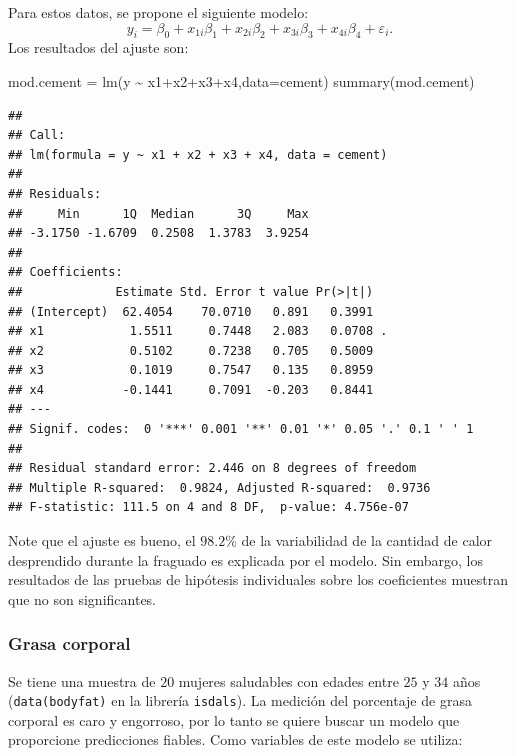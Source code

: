 \documentclass[
]{article}
\newenvironment{Shaded}{\begin{snugshade}}{\end{snugshade}}
\newcommand{\AttributeTok}[1]{\textcolor[rgb]{0.77,0.63,0.00}{#1}}
\newcommand{\FunctionTok}[1]{\textcolor[rgb]{0.00,0.00,0.00}{#1}}
\newcommand{\NormalTok}[1]{#1}
\newcommand{\OtherTok}[1]{\textcolor[rgb]{0.56,0.35,0.01}{#1}}
\newcommand{\SpecialCharTok}[1]{\textcolor[rgb]{0.00,0.00,0.00}{#1}}
\begin{document}
Para estos datos, se propone el siguiente modelo:
\[
y_{i} = \beta_{0} + x_{1i}\beta_{1} + x_{2i}\beta_{2} + x_{3i}\beta_{3} + x_{4i}\beta_{4} + \varepsilon_{i}.
\]
Los resultados del ajuste son:

\begin{Shaded}
\begin{Highlighting}[]
\NormalTok{mod.cement }\OtherTok{=} \FunctionTok{lm}\NormalTok{(y }\SpecialCharTok{\textasciitilde{}}\NormalTok{ x1}\SpecialCharTok{+}\NormalTok{x2}\SpecialCharTok{+}\NormalTok{x3}\SpecialCharTok{+}\NormalTok{x4,}\AttributeTok{data=}\NormalTok{cement)}
\FunctionTok{summary}\NormalTok{(mod.cement)}
\end{Highlighting}
\end{Shaded}

\begin{verbatim}
## 
## Call:
## lm(formula = y ~ x1 + x2 + x3 + x4, data = cement)
## 
## Residuals:
##     Min      1Q  Median      3Q     Max 
## -3.1750 -1.6709  0.2508  1.3783  3.9254 
## 
## Coefficients:
##             Estimate Std. Error t value Pr(>|t|)  
## (Intercept)  62.4054    70.0710   0.891   0.3991  
## x1            1.5511     0.7448   2.083   0.0708 .
## x2            0.5102     0.7238   0.705   0.5009  
## x3            0.1019     0.7547   0.135   0.8959  
## x4           -0.1441     0.7091  -0.203   0.8441  
## ---
## Signif. codes:  0 '***' 0.001 '**' 0.01 '*' 0.05 '.' 0.1 ' ' 1
## 
## Residual standard error: 2.446 on 8 degrees of freedom
## Multiple R-squared:  0.9824, Adjusted R-squared:  0.9736 
## F-statistic: 111.5 on 4 and 8 DF,  p-value: 4.756e-07
\end{verbatim}

Note que el ajuste es bueno, el \(98.2\)\% de la variabilidad de la cantidad de calor desprendido durante la fraguado es explicada por el modelo. Sin embargo, los resultados de las pruebas de hipótesis individuales sobre los coeficientes muestran que no son significantes.

\hypertarget{grasa-corporal}{%
\subsubsection{Grasa corporal}\label{grasa-corporal}}

Se tiene una muestra de \(20\) mujeres saludables con edades entre \(25\) y \(34\) años (\texttt{data(bodyfat)} en la librería \texttt{isdals}). La medición del porcentaje de grasa corporal es caro y engorroso, por lo tanto se quiere buscar un modelo que proporcione predicciones fiables. Como variables de este modelo se utiliza:
\end{document}
